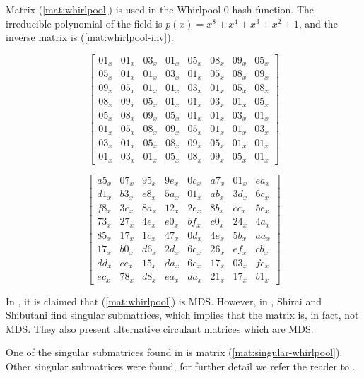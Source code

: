 Matrix (\ref{mat:whirlpool}) is used in the Whirlpool-0 hash function. The irreducible polynomial of the field is $p(x) = x^8+x^4+x^3+x^2+1$, and the inverse matrix is (\ref{mat:whirlpool-inv}).

\begin{equation}\label{mat:whirlpool}
\begin{bmatrix}
01_x & 01_x & 03_x & 01_x & 05_x & 08_x & 09_x & 05_x\\
05_x & 01_x & 01_x & 03_x & 01_x & 05_x & 08_x & 09_x\\
09_x & 05_x & 01_x & 01_x & 03_x & 01_x & 05_x & 08_x\\
08_x & 09_x & 05_x & 01_x & 01_x & 03_x & 01_x & 05_x\\
05_x & 08_x & 09_x & 05_x & 01_x & 01_x & 03_x & 01_x\\
01_x & 05_x & 08_x & 09_x & 05_x & 01_x & 01_x & 03_x\\
03_x & 01_x & 05_x & 08_x & 09_x & 05_x & 01_x & 01_x\\
01_x & 03_x & 01_x & 05_x & 08_x & 09_x & 05_x & 01_x
\end{bmatrix}
\end{equation}

\begin{equation}\label{mat:whirlpool-inv}
\begin{bmatrix}
a5_x & 07_x & 95_x & 9e_x & 0c_x & a7_x & 01_x & ea_x\\
d1_x & b3_x & e8_x & 5a_x & 01_x & ab_x & 3d_x & 6c_x\\
f8_x & 3c_x & 8a_x & 12_x & 2e_x & 8b_x & cc_x & 5e_x\\
73_x & 27_x & 4e_x & e0_x & bf_x & c0_x & 24_x & 4a_x\\
85_x & 17_x & 1c_x & 47_x & 0d_x & 4e_x & 5b_x & aa_x\\
17_x & b0_x & d6_x & 2d_x & 6c_x & 26_x & ef_x & cb_x\\
dd_x & ce_x & 15_x & da_x & 6c_x & 17_x & 03_x & fc_x\\
ec_x & 78_x & d8_x & ea_x & da_x & 21_x & 17_x & b1_x
\end{bmatrix}
\end{equation}

In \cite{Whirlpool2003}, it is claimed that (\ref{mat:whirlpool}) is MDS. However, in \cite{Shirai2003}, Shirai and Shibutani find singular submatrices, which implies that the matrix is, in fact, not MDS. They also present alternative circulant matrices which are MDS.

One of the singular submatrices found in \cite{Shirai2003} is matrix (\ref{mat:singular-whirlpool}). Other singular submatrices were found, for further detail we refer the reader to \cite{Shirai2003}.

